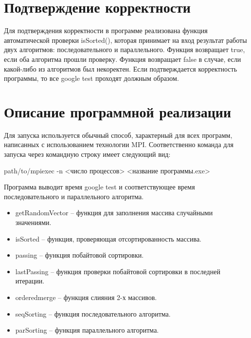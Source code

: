 \documentclass{report}
\begin{document}
\newpage

\section*{Подтверждение корректности}

\par Для подтверждения корректности в программе реализована функция автоматической проверки isSorted(), которая принимает на вход результат работы двух алгоритмов: последовательного и параллельного. Функция возвращает true, если оба алгоритма прошли проверку. Функция возвращает false в случае, если какой-либо из алгоритмов был некоректен. Если подтверждается корректность программы, то все google test проходят должным образом.

\newpage
\section*{Описание программной реализации}

\par Для запуска используется обычный способ, характерный для всех программ, написанных с использованием технологии MPI. Соответственно команда для запуска через командную строку имеет следующий вид:


path/to/mpiexec -n <число процессов> <название программы.exe>


\par Программа выводит время google test и соответствующее время последовательного и параллельного алгоритма.


\begin{itemize}

\item getRandomVector – функция для заполнения массива случайными значениями. 
\item isSorted – функция, проверяющая отсортированность массива.
\item passing – функция побайтовой сортировки.
\item lastPassing – функция проверки побайтовой сортировки в последней итерации.
\item orderedmerge – функция слияния 2-х массивов.
\item seqSorting – функция последовательного алгоритма.
\item parSorting – функция параллельного алгоритма.

\end{itemize}
\newpage
\end{document}
